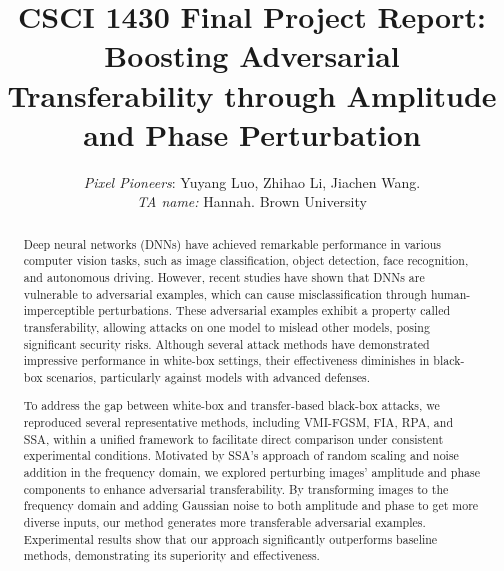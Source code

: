 \title{CSCI 1430 Final Project Report:\\Boosting Adversarial Transferability through Amplitude and Phase Perturbation}

\author{
    \emph{Pixel Pioneers}: Yuyang Luo, Zhihao Li, Jiachen Wang.\\
    \emph{TA name:} Hannah.
    Brown University\\
}

\maketitle

\begin{abstract}
Deep neural networks (DNNs) have achieved remarkable performance in various computer vision tasks, such as image classification, object detection, face recognition, and autonomous driving. However, recent studies have shown that DNNs are vulnerable to adversarial examples, which can cause misclassification through human-imperceptible perturbations. These adversarial examples exhibit a property called transferability, allowing attacks on one model to mislead other models, posing significant security risks. Although several attack methods have demonstrated impressive performance in white-box settings, their effectiveness diminishes in black-box scenarios, particularly against models with advanced defenses.

To address the gap between white-box and transfer-based black-box attacks, we reproduced several representative methods, including VMI-FGSM, FIA, RPA, and SSA, within a unified framework to facilitate direct comparison under consistent experimental conditions. Motivated by SSA's approach of random scaling and noise addition in the frequency domain, we explored perturbing images' amplitude and phase components to enhance adversarial transferability. By transforming images to the frequency domain and adding Gaussian noise to both amplitude and phase to get more diverse inputs, our method generates more transferable adversarial examples. Experimental results show that our approach significantly outperforms baseline methods, demonstrating its superiority and effectiveness.

\end{abstract}


